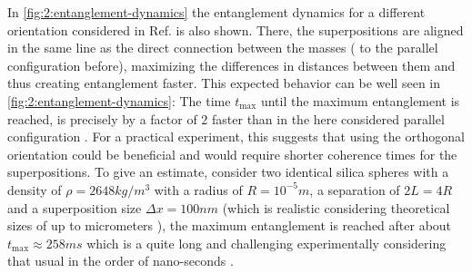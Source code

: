 In \cref{fig:2:entanglement-dynamics} the entanglement dynamics for a different orientation considered in Ref. \cite{Pedernales_2023} is also shown. 
There, the superpositions are aligned in the same line as the direct connection between the masses ( to the parallel configuration before), maximizing the differences in distances between them and thus creating entanglement faster. This expected behavior can be well seen in \cref{fig:2:entanglement-dynamics}: The time $t_\mathrm{max}$ until the maximum entanglement is reached, is precisely by a factor of $2$ faster than in the here considered parallel configuration \cite{Pedernales_2023}. 
For a practical experiment, this suggests that using the orthogonal orientation could be beneficial and would require shorter coherence times for the superpositions.
To give an estimate, consider two identical silica spheres with a density of $\rho=2648\si{kg/m^3}$ with a radius of $R=10^{-5}\si{m}$, a separation of $2L = 4R$ and a superposition size $\Delta x = 100\si{nm}$ (which is realistic considering theoretical sizes of up to micrometers \cite{Bose_2017}), the maximum entanglement is reached after about $t_\mathrm{max} \approx 258 \si{ms}$ which is a quite long and challenging experimentally considering that usual in the order of nano-seconds \cite{OConnell_2010}.